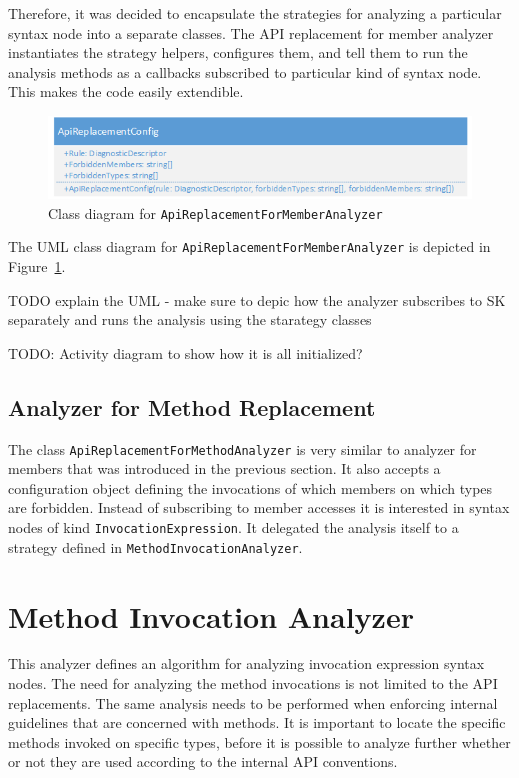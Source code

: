 \documentclass[
  digital, %
  table,   %
  lof,     %
  lot,     %
  oneside,
]{fithesis3}
\begin{document}
Therefore, it was decided to encapsulate the strategies for analyzing a particular syntax node into a separate classes. The API replacement for member analyzer instantiates the strategy helpers, configures them, and tell them to run the analysis methods as a callbacks subscribed to particular kind of syntax node. This makes the code easily extendible.

\begin{figure}[h!]
		\centering
			\includegraphics[scale=0.75]{img/uml/api-replacement-for-member}
		\caption{Class diagram for \texttt{ApiReplacementForMemberAnalyzer}}
		\label{fig:uml-api-replacement-for-member}
\end{figure}

The UML class diagram for \texttt{ApiReplacementForMemberAnalyzer} is depicted in Figure~\ref{fig:uml-api-replacement-for-member}.

TODO explain the UML - make sure to depic how the analyzer subscribes to SK separately and runs the analysis using the starategy classes

TODO: Activity diagram to show how it is all initialized?

\subsection{Analyzer for Method Replacement}
The class \texttt{ApiReplacementForMethodAnalyzer} is very similar to analyzer for members that was introduced in the previous section. It also accepts a configuration object defining the invocations of which members on which types are forbidden. 
Instead of subscribing to member accesses it is interested in syntax nodes of kind \texttt{InvocationExpression}. It delegated the analysis itself to a strategy defined in \texttt{MethodInvocationAnalyzer}.

\section{Method Invocation Analyzer}
This analyzer defines an algorithm for analyzing invocation expression syntax nodes. The need for analyzing the method invocations is not limited to the API replacements. The same analysis needs to be performed when enforcing internal guidelines that are concerned with methods. It is important to locate the specific methods invoked on specific types, before it is possible to analyze further whether or not they are used according to the internal API conventions. 
\end{document}
